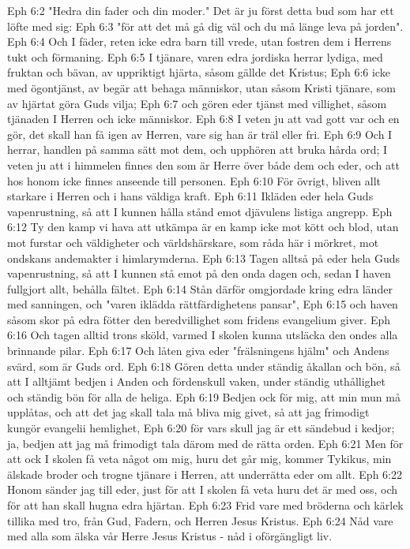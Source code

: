 Eph 6:2  "Hedra din fader och din moder." Det är ju först detta bud som har ett löfte med sig:
Eph 6:3  "för att det må gå dig väl och du må länge leva på jorden".
Eph 6:4  Och I fäder, reten icke edra barn till vrede, utan fostren dem i Herrens tukt och förmaning.
Eph 6:5  I tjänare, varen edra jordiska herrar lydiga, med fruktan och bävan, av uppriktigt hjärta, såsom gällde det Kristus;
Eph 6:6  icke med ögontjänst, av begär att behaga människor, utan såsom Kristi tjänare, som av hjärtat göra Guds vilja;
Eph 6:7  och gören eder tjänst med villighet, såsom tjänaden I Herren och icke människor.
Eph 6:8  I veten ju att vad gott var och en gör, det skall han få igen av Herren, vare sig han är träl eller fri.
Eph 6:9  Och I herrar, handlen på samma sätt mot dem, och upphören att bruka hårda ord; I veten ju att i himmelen finnes den som är Herre över både dem och eder, och att hos honom icke finnes anseende till personen.
Eph 6:10  För övrigt, bliven allt starkare i Herren och i hans väldiga kraft.
Eph 6:11  Ikläden eder hela Guds vapenrustning, så att I kunnen hålla stånd emot djävulens listiga angrepp.
Eph 6:12  Ty den kamp vi hava att utkämpa är en kamp icke mot kött och blod, utan mot furstar och väldigheter och världshärskare, som råda här i mörkret, mot ondskans andemakter i himlarymderna.
Eph 6:13  Tagen alltså på eder hela Guds vapenrustning, så att I kunnen stå emot på den onda dagen och, sedan I haven fullgjort allt, behålla fältet.
Eph 6:14  Stån därför omgjordade kring edra länder med sanningen, och "varen iklädda rättfärdighetens pansar",
Eph 6:15  och haven såsom skor på edra fötter den beredvillighet som fridens evangelium giver.
Eph 6:16  Och tagen alltid trons sköld, varmed I skolen kunna utsläcka den ondes alla brinnande pilar.
Eph 6:17  Och låten giva eder "frälsningens hjälm" och Andens svärd, som är Guds ord.
Eph 6:18  Gören detta under ständig åkallan och bön, så att I alltjämt bedjen i Anden och fördenskull vaken, under ständig uthållighet och ständig bön för alla de heliga.
Eph 6:19  Bedjen ock för mig, att min mun må upplåtas, och att det jag skall tala må bliva mig givet, så att jag frimodigt kungör evangelii hemlighet,
Eph 6:20  för vars skull jag är ett sändebud i kedjor; ja, bedjen att jag må frimodigt tala därom med de rätta orden.
Eph 6:21  Men för att ock I skolen få veta något om mig, huru det går mig, kommer Tykikus, min älskade broder och trogne tjänare i Herren, att underrätta eder om allt.
Eph 6:22  Honom sänder jag till eder, just för att I skolen få veta huru det är med oss, och för att han skall hugna edra hjärtan.
Eph 6:23  Frid vare med bröderna och kärlek tillika med tro, från Gud, Fadern, och Herren Jesus Kristus.
Eph 6:24  Nåd vare med alla som älska vår Herre Jesus Kristus - nåd i oförgängligt liv.


